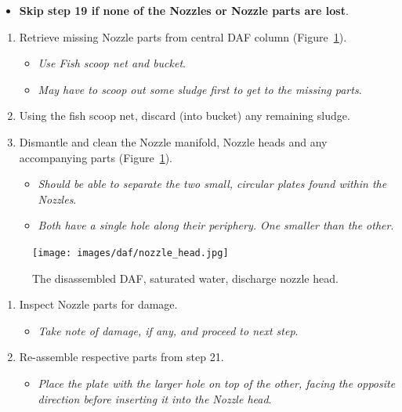 \documentclass[
  12pt,
]{report}
\providecommand{\tightlist}{%
  \setlength{\itemsep}{0pt}\setlength{\parskip}{0pt}}\usepackage{longtable,booktabs,array}
\begin{document}
\begin{itemize}
\tightlist
\item
  \textbf{Skip step 19 if none of the Nozzles or Nozzle parts are lost}.
\end{itemize}

\begin{enumerate}
\def\labelenumi{\arabic{enumi}.}
\setcounter{enumi}{18}
\tightlist
\item
  Retrieve missing Nozzle parts from central DAF column
  (Figure~\ref{fig-dafnozzle}).

  \begin{itemize}
  \tightlist
  \item
    \emph{Use Fish scoop net and bucket}.
  \item
    \emph{May have to scoop out some sludge first to get to the missing
    parts}.
  \end{itemize}
\item
  Using the fish scoop net, discard (into bucket) any remaining sludge.
\item
  Dismantle and clean the Nozzle manifold, Nozzle heads and any
  accompanying parts (Figure~\ref{fig-dafnozzle}).

  \begin{itemize}
  \tightlist
  \item
    \emph{Should be able to separate the two small, circular plates
    found within the Nozzles}.
  \item
    \emph{Both have a single hole along their periphery. One smaller
    than the other}.
  \end{itemize}
\end{enumerate}

\begin{figure}[H]

{\centering \texttt{[image: images/daf/nozzle\_head.jpg]}

}

\caption{\label{fig-dafnozzle}The disassembled DAF, saturated water,
discharge nozzle head.}

\end{figure}

\begin{enumerate}
\def\labelenumi{\arabic{enumi}.}
\setcounter{enumi}{21}
\tightlist
\item
  Inspect Nozzle parts for damage.

  \begin{itemize}
  \tightlist
  \item
    \emph{Take note of damage, if any, and proceed to next step}.
  \end{itemize}
\item
  Re-assemble respective parts from step 21.

  \begin{itemize}
  \tightlist
  \item
    \emph{Place the plate with the larger hole on top of the other,
    facing the opposite direction before inserting it into the Nozzle
    head}.
  \end{itemize}
\end{enumerate}
\end{document}
